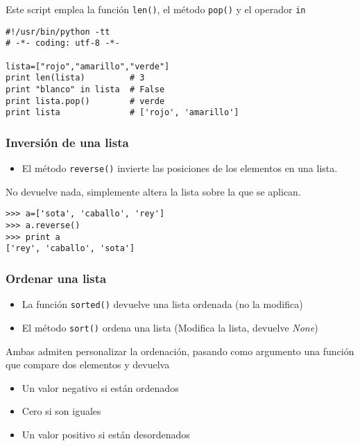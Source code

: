 \documentclass[ucs]{beamer}
\begin{document}
\begin{frame}[fragile]

Este script emplea la función \verb|len()|, el método \verb|pop()|
y el operador \verb|in|

  \begin{footnotesize}
  \begin{verbatim}
#!/usr/bin/python -tt
# -*- coding: utf-8 -*-

lista=["rojo","amarillo","verde"]
print len(lista)         # 3
print "blanco" in lista  # False
print lista.pop()        # verde
print lista              # ['rojo', 'amarillo']
  \end{verbatim}
  \end{footnotesize}

\end{frame}


\begin{frame}[fragile]
\frametitle{Inversión de una lista}

\begin{itemize}
\item El método \verb|reverse()| invierte las posiciones de los elementos en una
  lista.
\end{itemize}
No devuelve nada, simplemente altera la lista
sobre la que se aplican.
\begin{scriptsize}
\begin{verbatim}
>>> a=['sota', 'caballo', 'rey']
>>> a.reverse()
>>> print a
['rey', 'caballo', 'sota']
\end{verbatim}
\end{scriptsize}

\end{frame}


\begin{frame}[fragile]
\frametitle{Ordenar una lista}
\begin{itemize}
\item
La función \verb|sorted()| devuelve una lista ordenada (no la
modifica)
\item
El método \verb|sort()| ordena una lista (Modifica la lista, devuelve
\emph{None})
\end{itemize}

Ambas admiten personalizar la ordenación, pasando como argumento
una función que compare dos elementos y devuelva

\begin{itemize}
\item
Un valor negativo si están ordenados
\item
Cero si son iguales
\item
Un valor positivo si están desordenados
\end{itemize}

\end{frame}
\end{document}
